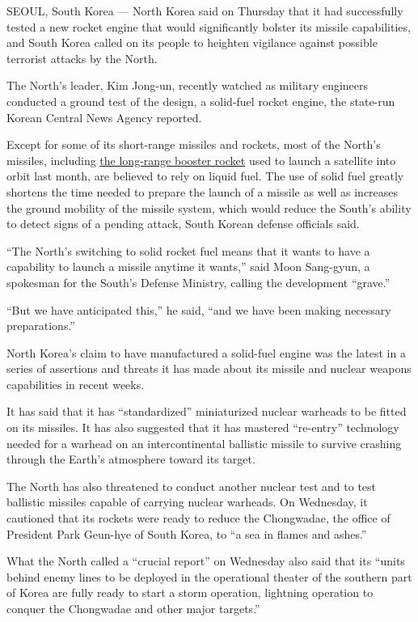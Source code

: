 SEOUL, South Korea --- North Korea said on Thursday that it had
successfully tested a new rocket engine that would significantly bolster
its missile capabilities, and South Korea called on its people to
heighten vigilance against possible terrorist attacks by the North.

The North's leader, Kim Jong-un, recently watched as military engineers
conducted a ground test of the design, a solid-fuel rocket engine, the
state-run Korean Central News Agency reported.

Except for some of its short-range missiles and rockets, most of the
North's missiles, including
\href{http://www.nytimes.com/2016/02/07/world/asia/north-korea-moves-up-rocket-launching-plan.html}{the
long-range booster rocket} used to launch a satellite into orbit last
month, are believed to rely on liquid fuel. The use of solid fuel
greatly shortens the time needed to prepare the launch of a missile as
well as increases the ground mobility of the missile system, which would
reduce the South's ability to detect signs of a pending attack, South
Korean defense officials said.

``The North's switching to solid rocket fuel means that it wants to have
a capability to launch a missile anytime it wants,'' said Moon
Sang-gyun, a spokesman for the South's Defense Ministry, calling the
development ``grave.''

``But we have anticipated this,'' he said, ``and we have been making
necessary preparations.''

North Korea's claim to have manufactured a solid-fuel engine was the
latest in a series of assertions and threats it has made about its
missile and nuclear weapons capabilities in recent weeks.

It has said that it has ``standardized'' miniaturized nuclear warheads
to be fitted on its missiles. It has also suggested that it has mastered
``re-entry'' technology needed for a warhead on an intercontinental
ballistic missile to survive crashing through the Earth's atmosphere
toward its target.

The North has also threatened to conduct another nuclear test and to
test ballistic missiles capable of carrying nuclear warheads. On
Wednesday, it cautioned that its rockets were ready to reduce the
Chongwadae, the office of President Park Geun-hye of South Korea, to ``a
sea in flames and ashes.''

What the North called a ``crucial report'' on Wednesday also said that
its ``units behind enemy lines to be deployed in the operational theater
of the southern part of Korea are fully ready to start a storm
operation, lightning operation to conquer the Chongwadae and other major
targets.''

